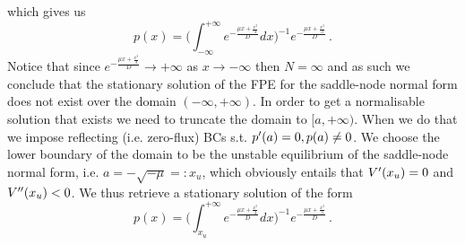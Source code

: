 \documentclass[../main.tex]{subfiles}
\begin{document}
\begin{example_continued}
     which gives us
     \begin{equation*}
         p(x) = \bigg(\int_{-\infty}^{+\infty}e^{-\frac{\mu x + \frac{x^{3}}{3}}{D}}dx\bigg)^{-1}e^{-\frac{\mu x + \frac{x^{3}}{3}}{D}}\,. 
     \end{equation*}
     Notice that since $e^{-\frac{\mu x + \frac{x^{3}}{3}}{D}}\to+\infty$ as $x\to-\infty$ then $N=\infty$ and as such we conclude that the stationary solution of the FPE for the saddle-node normal form does not exist over the domain $(-\infty,+\infty)$.
     In order to get a normalisable solution that exists we need to truncate the domain to $[a,+\infty)$.
     When we do that we impose reflecting (i.e. zero-flux) BCs s.t. $p'(a)=0,p(a)\neq0$.
     We choose the lower boundary of the domain to be the unstable equilibrium of the saddle-node normal form, i.e. $a = -\sqrt{-\mu}=:x_{u}$, which obviously entails that $V'(x_{u}) = 0$ and $V''(x_{u})<0$.
     We thus retrieve a stationary solution of the form
     \begin{equation*}
         p(x) = \bigg(\int_{x_{u}}^{+\infty}e^{-\frac{\mu x + \frac{x^{3}}{3}}{D}}dx\bigg)^{-1}e^{-\frac{\mu x + \frac{x^{3}}{3}}{D}}\,. 
     \end{equation*}
\end{example_continued}

\end{document}
